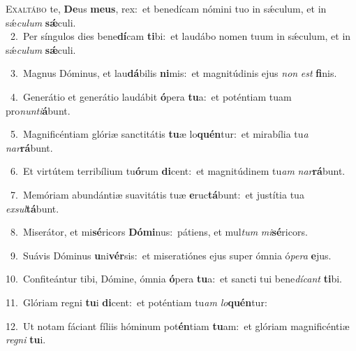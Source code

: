 \lettrine{\initial\textcolor{\initialcolor}{E}}{xaltábo} te, \textbf{De}\-us \textbf{me}\-\textbf{us}, rex:~\star et benedícam nómini tuo in sǽculum, et in sǽ\-\textit{cu}\-\textit{lum} \textbf{sǽ}\-culi.\\
{\numbfont\textcolor{\numbcolor}{~2.}}~Per síngulos dies bene\-\textbf{dí}\-cam \textbf{ti}\-bi:~\star et laudábo nomen tuum in sǽculum, et in sǽ\-\textit{cu}\-\textit{lum} \textbf{sǽ}\-culi.\par
{\numbfont\textcolor{\numbcolor}{~3.}}~Magnus Dóminus, et lau\-\textbf{dá}\-bilis \textbf{ni}\-mis:~\star et magnitúdinis ejus \textit{non} \textit{est} \textbf{fi}\-nis.\par
{\numbfont\textcolor{\numbcolor}{~4.}}~Generátio et generátio laudábit \textbf{ó}\-pera \textbf{tu}\-a:~\star et poténtiam tuam pro\-\textit{nun}\-\textit{ti}\textbf{á}bunt.\par
{\numbfont\textcolor{\numbcolor}{~5.}}~Magnificéntiam glóriæ sanctitátis \textbf{tu}\-æ lo\-\textbf{quén}\-tur:~\star et mirabília tu\textit{a} \textit{nar}\-\textbf{rá}bunt.\par
{\numbfont\textcolor{\numbcolor}{~6.}}~Et virtútem terribílium tu\-\textbf{ó}\-rum \textbf{di}\-cent:~\star et magnitúdinem tu\textit{am} \textit{nar}\-\textbf{rá}bunt.\par
{\numbfont\textcolor{\numbcolor}{~7.}}~Memóriam abundántiæ suavitátis tuæ \textbf{e}\-ruc\-\textbf{tá}\-bunt:~\star et justítia tua \textit{ex}\-\textit{sul}\textbf{tá}bunt.\par
{\numbfont\textcolor{\numbcolor}{~8.}}~Miserátor, et mi\-\textbf{sé}\-ricors \textbf{Dó}\-\textbf{mi}nus:~\star pátiens, et mul\textit{tum} \textit{mi}\-\textbf{sé}ricors.\par
{\numbfont\textcolor{\numbcolor}{~9.}}~Suávis Dóminus \textbf{u}\-ni\-\textbf{vér}\-sis:~\star et miseratiónes ejus super ómnia ó\-\textit{pe}\-\textit{ra} \textbf{e}\-jus.\par
{\numbfont\textcolor{\numbcolor}{10.}}~Confiteántur tibi, Dómine, ómnia \textbf{ó}\-pera \textbf{tu}\-a:~\star et sancti tui bene\-\textit{dí}\-\textit{cant} \textbf{ti}\-bi.\par
{\numbfont\textcolor{\numbcolor}{11.}}~Glóriam regni \textbf{tu}\-i \textbf{di}\-cent:~\star et poténtiam tu\textit{am} \textit{lo}\-\textbf{quén}tur:\par
{\numbfont\textcolor{\numbcolor}{12.}}~Ut notam fáciant fíliis hóminum pot\-\textbf{én}\-tiam \textbf{tu}\-am:~\star et glóriam magnificéntiæ \textit{re}\-\textit{gni} \textbf{tu}\-i.\par
